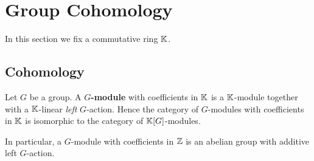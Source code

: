 \section{Group Cohomology}
In this section we fix a commutative ring $\mathbb{K}$.
\subsection{Cohomology}
Let $G$ be a group. A \textbf{$G$-module} with coefficients in $\mathbb{K}$ is a $\mathbb{K}$-module together with a $\mathbb{K}$-linear \textit{left} $G$-action. Hence the category of $G$-modules with coefficients in $\mathbb{K}$ is isomorphic to the category of $\mathbb{K}[G]$-modules.
\begin{remark}
    In particular, a $G$-module with coefficients in $\mathbb{Z}$ is an abelian group with additive left $G$-action. 
\end{remark}

